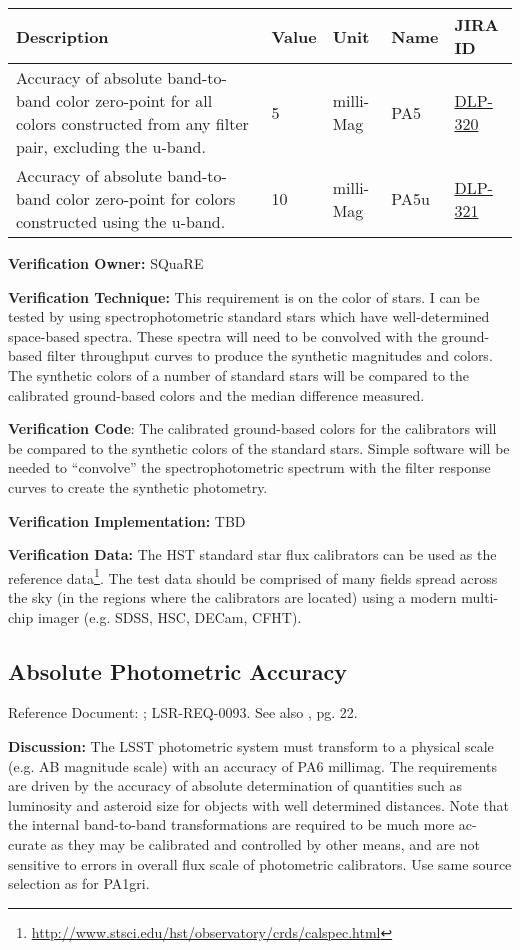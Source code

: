 \documentclass[DM,lsstdraft,toc]{lsstdoc}
\newcommand{\jira}[1]{\href{https://jira.lsstcorp.org/browse/#1}{#1}}
\begin{document}
\begin{longtable}[]{@{}p{}llll@{}}
\toprule
Description & Value & Unit & Name & JIRA ID\tabularnewline
\midrule
\endhead
Accuracy of absolute band-to-band color zero-point for all colors
constructed from any filter pair, excluding the u-band. & 5 & milli-Mag
& PA5 & \jira{DLP-320}\tabularnewline
Accuracy of absolute band-to-band color zero-point for colors
constructed using the u-band. & 10 & milli-Mag & PA5u &
\jira{DLP-321}\tabularnewline
\bottomrule
\end{longtable}

\textbf{Verification Owner:} SQuaRE

\textbf{Verification Technique:} This requirement is on the color of
stars. I can be tested by using spectrophotometric standard stars which
have well-determined space-based spectra. These spectra will need to be
convolved with the ground-based filter throughput curves to produce the
synthetic magnitudes and colors. The synthetic colors of a number of
standard stars will be compared to the calibrated ground-based colors
and the median difference measured.

\textbf{Verification Code}: The calibrated ground-based colors for the
calibrators will be compared to the synthetic colors of the standard
stars. Simple software will be needed to ``convolve'' the
spectrophotometric spectrum with the filter response curves to create
the synthetic photometry.

\textbf{Verification Implementation:} TBD

\textbf{Verification Data:} The HST standard star flux calibrators can
be used as the reference data\footnote{\url{http://www.stsci.edu/hst/observatory/crds/calspec.html}}. The test data
should be comprised of many fields spread across the sky (in the regions
where the calibrators are located) using a modern multi-chip imager
(e.g. SDSS, HSC, DECam, CFHT).

\subsection{Absolute Photometric
Accuracy}\label{absolute-photometric-accuracy}

Reference Document: ; LSR-REQ-0093. See also \SRD, pg. 22.

\textbf{Discussion:} The LSST photometric system must transform to a
physical scale (e.g. AB magnitude scale) with an accuracy of PA6
millimag. The requirements are driven by the accuracy of absolute
determination of quantities such as luminosity and asteroid size for
objects with well determined distances. Note that the internal
band-to-band transformations are required to be much more ac- curate as
they may be calibrated and controlled by other means, and are not
sensitive to errors in overall flux scale of photometric calibrators.
Use same source selection as for PA1gri.
\end{document}
